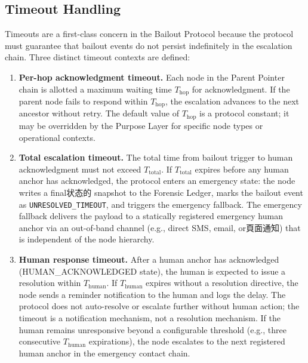\subsection{Timeout Handling}
\label{sec:timeout-handling}

Timeouts are a first-class concern in the Bailout Protocol because the protocol must guarantee that bailout events do not persist indefinitely in the escalation chain. Three distinct timeout contexts are defined:

\begin{enumerate}
    \item \textbf{Per-hop acknowledgment timeout.} Each node in the Parent Pointer chain is allotted a maximum waiting time $T_{\text{hop}}$ for acknowledgment. If the parent node fails to respond within $T_{\text{hop}}$, the escalation advances to the next ancestor without retry. The default value of $T_{\text{hop}}$ is a protocol constant; it may be overridden by the Purpose Layer for specific node types or operational contexts.

    \item \textbf{Total escalation timeout.} The total time from bailout trigger to human acknowledgment must not exceed $T_{\text{total}}$. If $T_{\text{total}}$ expires before any human anchor has acknowledged, the protocol enters an emergency state: the node writes a final状态的 snapshot to the Forensic Ledger, marks the bailout event as \texttt{UNRESOLVED\_TIMEOUT}, and triggers the emergency fallback. The emergency fallback delivers the payload to a statically registered emergency human anchor via an out-of-band channel (e.g., direct SMS, email, or頁面通知) that is independent of the node hierarchy.

    \item \textbf{Human response timeout.} After a human anchor has acknowledged (HUMAN\_ACKNOWLEDGED state), the human is expected to issue a resolution within $T_{\text{human}}$. If $T_{\text{human}}$ expires without a resolution directive, the node sends a reminder notification to the human and logs the delay. The protocol does not auto-resolve or escalate further without human action; the timeout is a notification mechanism, not a resolution mechanism. If the human remains unresponsive beyond a configurable threshold (e.g., three consecutive $T_{\text{human}}$ expirations), the node escalates to the next registered human anchor in the emergency contact chain.
\end{enumerate}


